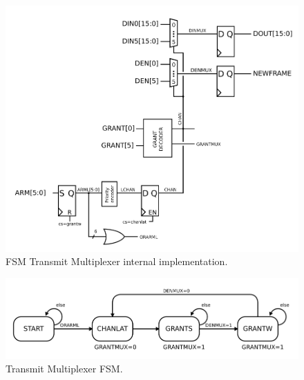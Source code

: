 \begin{figure}
\begin{centering}
\includegraphics[scale=0.8]{txmux.svg}
\end{centering}
\caption{FSM Transmit Multiplexer internal implementation.}
\label{txmux}
\end{figure}


\begin{figure}
\begin{centering}
\includegraphics[scale=0.8]{txmux.fsm.svg}
\end{centering}
\caption{Transmit Multiplexer FSM. }
\label{txmux.fsm}
\end{figure}


